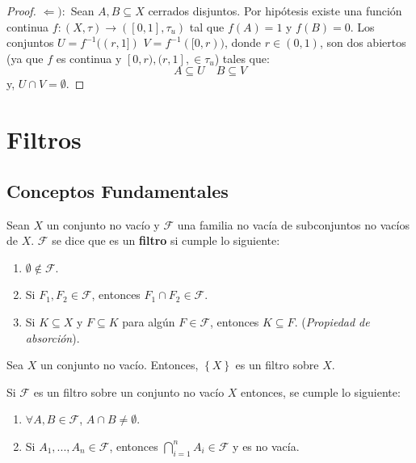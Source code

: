 \documentclass[12pt]{report}
\theoremstyle{largebreak}
\newcommand\cf[3]{\ensuremath{#1:#2\rightarrow#3}}
\begin{document}
\begin{proof}
        $\Leftarrow):$ Sean $A,B\subseteq X$ cerrados disjuntos. Por hipótesis existe una función continua $\cf{f}{(X,\tau)}{([0,1],\tau_u)}$ tal que $f(A)=1$ y $f(B)=0$. Los conjuntos $U=f^{-1}((r,1])$ $V=f^{-1}([0,r))$, donde $r\in(0,1)$, son dos abiertos (ya que $f$ es continua y $[0,r),(r,1],\in\tau_u$) tales que:
        \begin{equation*}
            A\subseteq U\quad B\subseteq V
        \end{equation*}
        y, $U\cap V=\emptyset$.
    \end{proof}

    \chapter{Filtros}

    \section{Conceptos Fundamentales}

    \begin{mydef}
        Sean $X$ un conjunto no vacío y $\mathcal{F}$ una familia no vacía de subconjuntos no vacíos de $X$. $\mathcal{F}$ se dice que es un \textbf{filtro} si cumple lo siguiente:
        \begin{enumerate}
            \item $\emptyset\notin\mathcal{F}$.
            \item Si $F_1,F_2\in\mathcal{F}$, entonces $F_1\cap F_2\in\mathcal{F}$.
            \item Si $K\subseteq X$ y $F\subseteq K$ para algún $F\in\mathcal{F}$, entonces $K\subseteq F$. (\textit{Propiedad de absorción}).
        \end{enumerate}
    \end{mydef}

    \begin{exa}
        Sea $X$ un conjunto no vacío. Entonces, $\left\{X\right\}$ es un filtro sobre $X$.
    \end{exa}

    \begin{obs}
        Si $\mathcal{F}$ es un filtro sobre un conjunto no vacío $X$ entonces, se cumple lo siguiente:
        \begin{enumerate}
            \item $\forall A,B\in\mathcal{F}$, $A\cap B\neq\emptyset$.
            \item Si $A_1,...,A_n\in\mathcal{F}$, entonces $\bigcap_{i=1}^nA_i\in\mathcal{F}$ y es no vacía.
        \end{enumerate}
    \end{obs}
\end{document}
